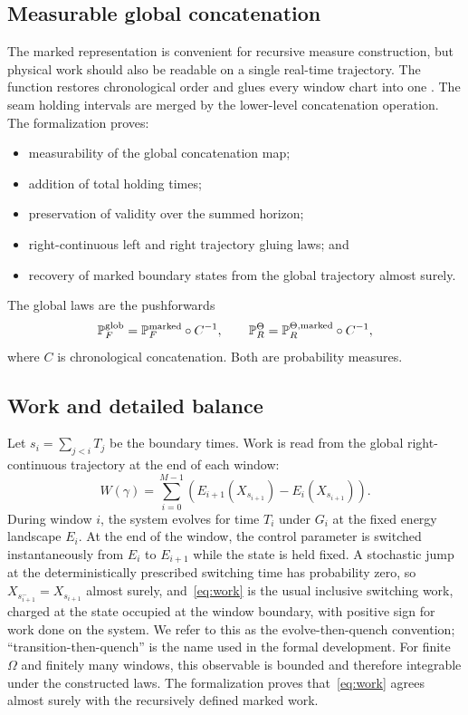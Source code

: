 \subsection{Measurable global concatenation}

The marked representation is convenient for recursive measure construction, but physical work should also be readable on a single real-time trajectory. The function  restores chronological order and glues every window chart into one . The seam holding intervals are merged by the lower-level concatenation operation. The formalization proves:

\begin{itemize}[leftmargin=*]
  \item measurability of the global concatenation map;
  \item addition of total holding times;
  \item preservation of validity over the summed horizon;
  \item right-continuous left and right trajectory gluing laws; and
  \item recovery of marked boundary states from the global trajectory almost surely.
\end{itemize}

The global laws are the pushforwards
\[
  \mathbb{P}_F^{\mathrm{glob}}
  =\mathbb{P}_F^{\mathrm{marked}}\circ C^{-1},
  \qquad
  \mathbb{P}_R^{\Theta}
  =\mathbb{P}_R^{\Theta,\mathrm{marked}}\circ C^{-1},
\]
where $C$ is chronological concatenation. Both are probability measures.

\subsection{Work and detailed balance}

Let $s_i=\sum_{j<i}T_j$ be the boundary times. Work is read from the global right-continuous trajectory at the end of each window:
\begin{equation}
\label{eq:work}
  W(\gamma)=\sum_{i=0}^{M-1}
  \left(E_{i+1}(X_{s_{i+1}})-E_i(X_{s_{i+1}})\right).
\end{equation}
During window $i$, the system evolves for time $T_i$ under $G_i$ at the fixed energy landscape $E_i$. At the end of the window, the control parameter is switched instantaneously from $E_i$ to $E_{i+1}$ while the state is held fixed. A stochastic jump at the deterministically prescribed switching time has probability zero, so $X_{s_{i+1}^-}=X_{s_{i+1}}$ almost surely, and~\eqref{eq:work} is the usual inclusive switching work, charged at the state occupied at the window boundary, with positive sign for work done on the system. We refer to this as the evolve-then-quench convention; ``transition-then-quench'' is the name used in the formal development. For finite $\Omega$ and finitely many windows, this observable is bounded and therefore integrable under the constructed laws. The formalization proves that~\eqref{eq:work} agrees almost surely with the recursively defined marked work.


